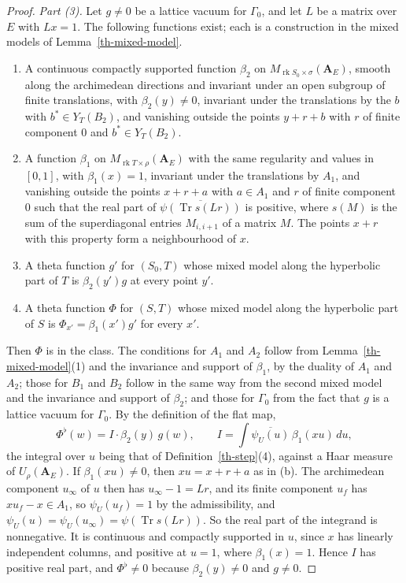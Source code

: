 \begin{proof}
\emph{Part (3).} Let $g\neq0$ be a lattice vacuum for $\Gamma_0$, and let $L$ be
a matrix over $E$ with $Lx=1$. The following functions exist; each is a
construction in the mixed models of Lemma~\ref{th-mixed-model}.
\begin{enumerate}
\item[(a)] A continuous compactly supported function $\beta_2$ on
  $M_{\operatorname{rk}S_0\times\sigma}(\mathbf A_E)$, smooth along the
  archimedean directions and invariant under an open subgroup of finite
  translations, with $\beta_2(y)\neq0$, invariant under the translations by the
  $b$ with $b^*\in Y_T(B_2)$, and vanishing outside the points $y+r+b$ with $r$
  of finite component $0$ and $b^*\in Y_T(B_2)$.
\item[(b)] A function $\beta_1$ on $M_{\operatorname{rk}T\times\rho}(\mathbf A_E)$
  with the same regularity and values in $[0,1]$, with $\beta_1(x)=1$, invariant
  under the translations by $A_1$, and vanishing outside the points $x+r+a$ with
  $a\in A_1$ and $r$ of finite component $0$ such that the real part of
  $\overline{\psi(\operatorname{Tr}s(Lr))}$ is positive, where $s(M)$ is the sum
  of the superdiagonal entries $M_{i,i+1}$ of a matrix $M$. The points $x+r$ with
  this property form a neighbourhood of $x$.
\item[(c)] A theta function $g'$ for $(S_0,T)$ whose mixed model along the
  hyperbolic part of $T$ is $\beta_2(y')g$ at every point $y'$.
\item[(d)] A theta function $\Phi$ for $(S,T)$ whose mixed model along the
  hyperbolic part of $S$ is $\Phi_{x'}=\beta_1(x')g'$ for every $x'$.
\end{enumerate}
Then $\Phi$ is in the class. The conditions for $A_1$ and $A_2$ follow from
Lemma~\ref{th-mixed-model}(1) and the invariance and support of $\beta_1$, by
the duality of $A_1$ and $A_2$; those for $B_1$ and $B_2$ follow in the same
way from the second mixed model and the invariance and support of $\beta_2$; and
those for $\Gamma_0$ from the fact that $g$ is a lattice vacuum for $\Gamma_0$.
By the definition of the flat map,
\[
\Phi^\flat(w)=I\cdot\beta_2(y)\,g(w),\qquad
I=\int\overline{\psi_U(u)}\,\beta_1(xu)\,du,
\]
the integral over $u$ being that of Definition~\ref{th-step}(4), against a Haar
measure of $U_\rho(\mathbf A_E)$. If $\beta_1(xu)\neq0$, then $xu=x+r+a$ as in
(b). The archimedean component $u_\infty$ of $u$ then has $u_\infty-1=Lr$, and
its finite component $u_f$ has $xu_f-x\in A_1$, so $\psi_U(u_f)=1$ by the
admissibility, and $\psi_U(u)=\psi_U(u_\infty)=\psi(\operatorname{Tr}s(Lr))$. So
the real part of the integrand is nonnegative. It is continuous and compactly
supported in $u$, since $x$ has linearly independent columns, and positive at
$u=1$, where $\beta_1(x)=1$. Hence $I$ has positive real part, and
$\Phi^\flat\neq0$ because $\beta_2(y)\neq0$ and $g\neq0$.


\end{proof}
